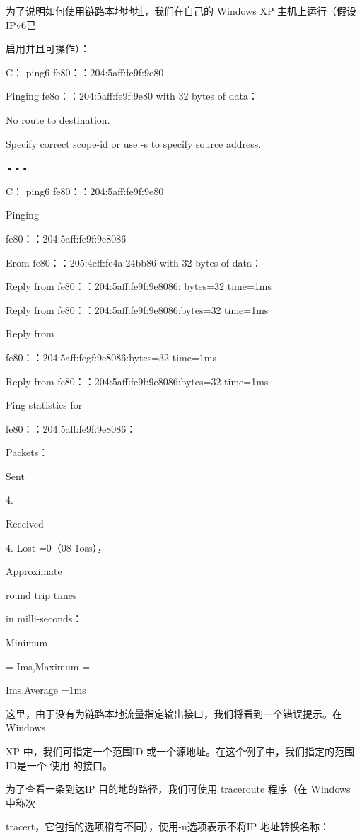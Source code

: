 为了说明如何使用链路本地地址，我们在自己的 Windows XP 主机上运行（假设IPv6已

启用并且可操作）：

C：\> ping6 fe80：：204:5aff:fe9f:9e80

Pinging fe8o：：204:5aff:fe9f:9e80 with 32 bytes of data：

No route to destination.

Specify correct scope-id or use -s to specify source address.

•••

C：\> ping6 fe80：：204:5aff:fe9f:9e80%

Pinging

fe80：：204:5aff:fe9f:9e8086

Erom fe80：：205:4eff:fe4a:24bb86 with 32 bytes of data：

Reply from fe80：：204:5aff:fe9f:9e8086: bytes=32 time=1ms

Reply from fe80：：204:5aff:fe9f:9e8086:bytes=32 time=1ms

Reply from

fe80：：204:5aff:fegf:9e8086:bytes=32 time=1ms

Reply from fe80：：204:5aff:fe9f:9e8086:bytes=32 time=1ms

Ping statistics for

fe80：：204:5aff:fe9f:9e8086：

Packets：

Sent

4.

Received

4. Lost =0（08 1oss），

Approximate

round trip times

in milli-seconds：

Minimum

= Ims,Maximum =

Ims,Average =1ms

这里，由于没有为链路本地流量指定输出接口，我们将看到一个错误提示。在 Windows

XP 中，我们可指定一个范围ID 或一个源地址。在这个例子中，我们指定的范围ID是一个
使用%
的接口。

为了查看一条到达IP 目的地的路径，我们可使用 traceroute 程序（在 Windows 中称次

tracert，它包括的选项稍有不同），使用-n选项表示不将IP 地址转换名称：

